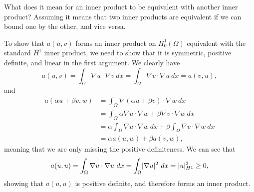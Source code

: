\begin{solution}
    \textcolor{red!75}{What does it mean for an inner product to be equivalent with another inner product?}
    \textcolor{blue!50}{Assuming it means that two inner products are equivalent if we can bound one by the other, and vice versa.}

    \noindent
    To show that $a(u, v)$ forms an inner product on $H^1_0(\Omega)$ equivalent with the standard $H^1$ inner product, we need to show that it is symmetric, positive definite, and linear in the first argument.
    We clearly have
    \begin{equation*}
        a(u, v) = \int_\Omega \nabla u \cdot \nabla v \ dx = \int_\Omega \nabla v \cdot \nabla u \ dx = a(v, u),
    \end{equation*}
    and
    \begin{align*}
        a(\alpha u + \beta v, w)
        &= \int_\Omega \nabla (\alpha u + \beta v) \cdot \nabla w \ dx \\
        &= \int_\Omega \alpha \nabla u \cdot \nabla w + \beta \nabla v \cdot \nabla w \ dx \\
        &= \alpha \int_\Omega \nabla u \cdot \nabla w \ dx + \beta \int_\Omega \nabla v \cdot \nabla w \ dx \\
        &= \alpha a(u, w) + \beta a(v, w),
    \end{align*}
    meaning that we are only missing the positive definiteness.
    We can see that
    \begin{equation*}
        a(u, u) = \int_\Omega \nabla u \cdot \nabla u \ dx = \int_\Omega \lvert \nabla u \rvert^2 \ dx = \abs{u}_{H^1}^2 \geq 0,
    \end{equation*}
    showing that $a(u, u)$ is positive definite, and therefore forms an inner product.
\end{solution}